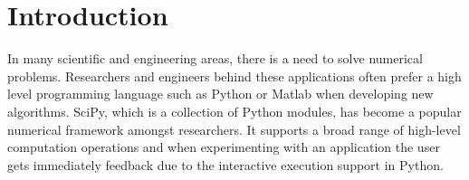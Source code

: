 \documentclass[10pt]{article}
\begin{document}




%
%
%




\section{Introduction}
In many scientific and engineering areas, there is a need to solve numerical problems. Researchers and engineers behind these applications often prefer a high level programming language such as Python\cite{Python} or Matlab when developing new algorithms. SciPy\cite{SciPy}, which is a collection of Python modules, has become a popular numerical framework amongst researchers. It supports a broad range of high-level computation operations and when experimenting with an application the user gets immediately feedback due to the interactive execution support in Python. 
\end{document}
